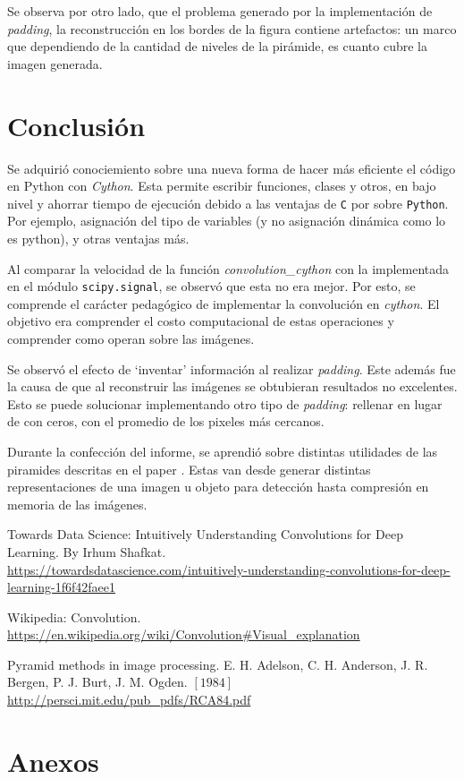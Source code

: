 \documentclass[12pt, letterpaper]{article}
\begin{document}
\par Se observa por otro lado, que el problema generado por la implementación de \textit{padding}, la reconstrucción en los bordes de la figura contiene artefactos: un marco que dependiendo de la cantidad de niveles de la pirámide, es cuanto cubre la imagen generada. 


\newpage
\section{Conclusión}
Se adquirió conociemiento sobre una nueva forma de hacer más eficiente el código en Python con \textit{Cython}. Esta permite escribir funciones, clases y otros, en bajo nivel y ahorrar tiempo de ejecución debido a las ventajas de \texttt{C} por sobre \texttt{Python}. Por ejemplo, asignación del tipo de variables (y no asignación dinámica como lo es python), y otras ventajas más. 

\par Al comparar la velocidad de la función \textit{convolution\_cython} con la implementada en el módulo \texttt{scipy.signal}, se observó que esta no era mejor. Por esto, se comprende el carácter pedagógico de implementar la convolución en \textit{cython}. El objetivo era comprender el costo computacional de estas operaciones y comprender como operan sobre las imágenes. 

\par Se observó el efecto de `inventar' información al realizar \textit{padding}. Este además fue la causa de que al reconstruir las imágenes se obtubieran resultados no excelentes. Esto se puede solucionar implementando otro tipo de \textit{padding}: rellenar en lugar de con ceros, con el promedio de los pixeles más cercanos. 

\par Durante la confección del informe, se aprendió sobre distintas utilidades de las piramides descritas en el paper \cite{paperPyramids}. Estas van desde generar distintas representaciones de una imagen u objeto para detección hasta compresión en memoria de las imágenes. 

\newpage
\begin{thebibliography}{X}
   Towards Data Science: Intuitively Understanding Convolutions for Deep Learning. By Irhum Shafkat. \\
  \url{https://towardsdatascience.com/intuitively-understanding-convolutions-for-deep-learning-1f6f42faee1}   

   Wikipedia: Convolution. \\
  \url{https://en.wikipedia.org/wiki/Convolution#Visual_explanation} 

   Pyramid methods in image processing. E. H. Adelson, C. H. Anderson,  J. R. Bergen,  P. J. Burt,  J. M. Ogden. $[1984]$
  \url{http://persci.mit.edu/pub_pdfs/RCA84.pdf}

\end{thebibliography}

\section{Anexos}
\end{document}
